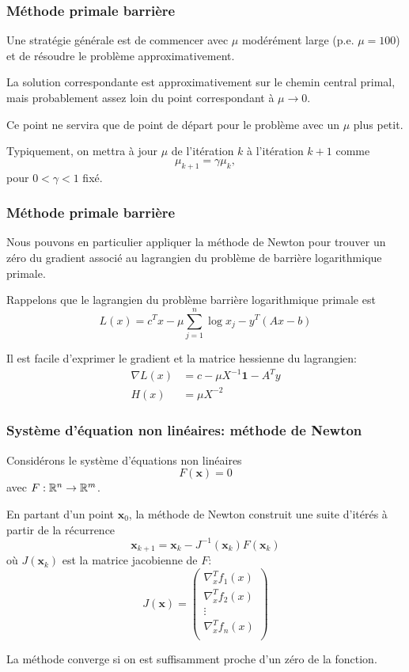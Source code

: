 \documentclass[usepdftitle=false, aspectratio=169]{beamer}
\def\bx{\boldsymbol{x}}
\def\bone{\boldsymbol{1}}
\begin{document}
\begin{frame}
\frametitle{Méthode primale barrière}

Une stratégie générale est de commencer avec $\mu$ modérément large (p.e. $\mu = 100$) et de résoudre le problème approximativement.

\mbox{}

La solution correspondante est approximativement sur le chemin central primal, mais probablement assez loin du point correspondant à $\mu \rightarrow 0$.

\mbox{}

Ce point ne servira que de point de départ pour le problème avec un $\mu$ plus petit.

\mbox{}

Typiquement, on mettra à jour $\mu$ de l'itération $k$ à l'itération $k+1$ comme
\[
\mu_{k+1} = \gamma \mu_k,
\]
pour $0< \gamma < 1$ fixé.

\end{frame}

\begin{frame}
\frametitle{Méthode primale barrière}

Nous pouvons en particulier appliquer la méthode de Newton pour trouver un zéro du gradient associé au lagrangien du problème de barrière logarithmique primale.

\mbox{}

Rappelons que le lagrangien du problème barrière logarithmique primale est
$$
L(x) = c^Tx - \mu \sum_{j = 1}^n \log x_j - y^T(Ax-b)
$$

\mbox{}

Il est facile d'exprimer le gradient et la matrice hessienne du lagrangien:
\begin{align*}
\nabla L(x) &= c-\mu X^{-1}\bone - A^Ty \\
H(x) & = \mu X^{-2}
\end{align*}

\end{frame}

\begin{frame}
	\frametitle{Système d'équation non linéaires: méthode de Newton}
	
	Considérons le système d'équations non linéaires
	$$
	F(\bx) = 0
	$$
	avec $F: {\mathbb{R}}^n \rightarrow {\mathbb{R}}^m$.
	
	\mbox{}
	
	En partant d'un point $\bx_0$, la méthode de Newton construit une suite d'itérés à partir de la récurrence
	$$
	\bx_{k+1} = \bx_k - J^{-1}(\bx_k) F(\bx_k)
	$$
	où $J(\bx_k)$ est la matrice jacobienne de $F$:
	\[
	J(\bx) =
	\begin{pmatrix}
		\nabla^T_x f_1(x) \\
		\nabla^T_x f_2(x) \\
		\vdots \\
		\nabla^T_x f_n(x) \\
	\end{pmatrix}
	\]
	
	La méthode converge si on est suffisamment proche d'un zéro de la fonction.
	
\end{frame}
\end{document}
